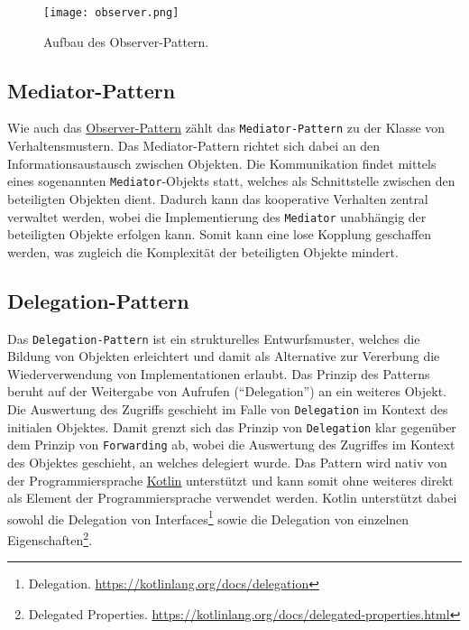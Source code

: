 \begin{figure}[H]
    \texttt{[image: observer.png]}
    \caption{Aufbau des Observer-Pattern.}\label{fig:observer}
\end{figure}

\subsection{Mediator-Pattern}

Wie auch das \hyperref[sub:observer]{Observer-Pattern} zählt das \texttt{Mediator-Pattern} zu der Klasse von Verhaltensmustern. Das Mediator-Pattern richtet sich dabei an den Informationsaustausch zwischen Objekten. Die Kommunikation findet mittels eines sogenannten \texttt{Mediator}-Objekts statt, welches als Schnittstelle zwischen den beteiligten Objekten dient. Dadurch kann das kooperative Verhalten zentral verwaltet werden, wobei die Implementierung des \texttt{Mediator} unabhängig der beteiligten Objekte erfolgen kann. Somit kann eine lose Kopplung geschaffen werden, was zugleich die Komplexität der beteiligten Objekte mindert. 


\subsection{Delegation-Pattern}\label{subsec:delegation}

Das \texttt{Delegation-Pattern} ist ein strukturelles Entwurfsmuster, welches die Bildung von Objekten erleichtert und damit als Alternative zur Vererbung die Wiederverwendung von Implementationen erlaubt. Das Prinzip des Patterns beruht auf der Weitergabe von Aufrufen (\enquote{Delegation}) an ein weiteres Objekt. Die Auswertung des Zugriffs geschieht im Falle von \texttt{Delegation} im Kontext des initialen Objektes. Damit grenzt sich das Prinzip von \texttt{Delegation} klar gegenüber dem Prinzip von \texttt{Forwarding} ab, wobei die Auswertung des Zugriffes im Kontext des Objektes geschieht, an welches delegiert wurde. Das Pattern wird nativ von der Programmiersprache \hyperref[sec:kotlin]{Kotlin} unterstützt und kann somit ohne weiteres direkt als Element der Programmiersprache verwendet werden. Kotlin unterstützt dabei sowohl die Delegation von Interfaces\footnote{Delegation. \url{https://kotlinlang.org/docs/delegation}} sowie die Delegation von einzelnen Eigenschaften\footnote{Delegated Properties. \url{https://kotlinlang.org/docs/delegated-properties.html}}.
